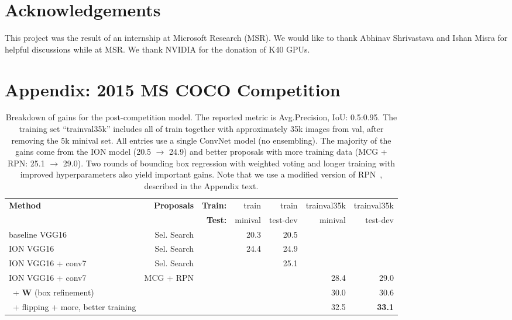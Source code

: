 \documentclass[10pt,twocolumn,letterpaper]{article}
\begin{document}
\section*{Acknowledgements}
This project was the result of an internship at Microsoft Research (MSR).  We
would like to thank Abhinav Shrivastava and Ishan Misra for helpful discussions
while at MSR.  We thank NVIDIA for the donation of K40 GPUs.




{\small


}

\vfill\newpage\section*{Appendix: 2015 MS COCO Competition}\begin{table*}[t]
  \centering
  \small{\begin{tabular}{%
  lrrrrrr}
  \toprule
  \multirow{2}{*}{\textbf{Method}} &
  \multirow{2}{*}{\textbf{Proposals}} &
  \textbf{Train:} &
  train & train &
  trainval35k &
  trainval35k \\
  & &
  \textbf{Test:} &
  minival &
  test-dev &
  minival &
  test-dev \\
  \midrule
  baseline VGG16 & Sel. Search & & 20.3 & 20.5 & & \\
  ION VGG16 & Sel. Search & & 24.4 & 24.9 & & \\
  ION VGG16 + conv7& Sel. Search & & & 25.1 & & \\
  ION VGG16 + conv7& MCG + RPN & & & & 28.4 & 29.0 \\
  ~+ \textbf{W} (box refinement) & & & & & 30.0 & 30.6 \\
  ~+ flipping + more, better training & & & & & 32.5 & \textbf{33.1} \\
  \bottomrule
\end{tabular}
  \vspace{3pt}
  \caption{%
    Breakdown of gains for the post-competition model. The reported metric is
    Avg.\@ Precision, IoU: 0.5:0.95. The training set ``trainval35k'' includes all
    of train together with approximately 35k images from val, after removing the
    5k minival set.  All entries use a single ConvNet model (no ensembling).
    The majority of the gains come from the ION model (20.5 $\rightarrow$ 24.9)
    and better proposals with more training data (MCG + RPN: 25.1 $\rightarrow$ 29.0).
    Two rounds of bounding box regression with weighted voting and longer
    training with improved hyperparameters also yield important gains.  Note
    that we use a modified version of RPN~\cite{ren2015faster}, described in the
    Appendix text.
  }
  \label{tab:coco-breakdown}
}
\end{table*}
\end{document}
